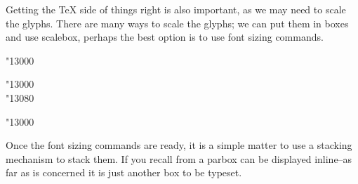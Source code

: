 Getting the TeX side of things right is also important, as we may need to scale the glyphs. There are many ways to scale the glyphs; we can put them in boxes and use scalebox, perhaps the best option is to use font sizing commands.

\begin{center}

{\hiero\fontsize{2cm}{0.5em}\selectfont \char"13000}
{\hiero\fontsize{1cm}{0.25em}\selectfont 
\parbox[b]{1cm}{\hiero\char"13000\\ \char"13080}
}
{
\hiero\fontsize{0.66cm}{0.5em}\selectfont 
{}
\hiero\fontsize{2cm}{0.5em}\selectfont \char"13000
}



\end{center}

Once the font sizing commands are ready, it is a simple matter to use a stacking mechanism to stack them. If you recall from a parbox can be displayed inline--as far as \tex is concerned it is just another box to be typeset.  



